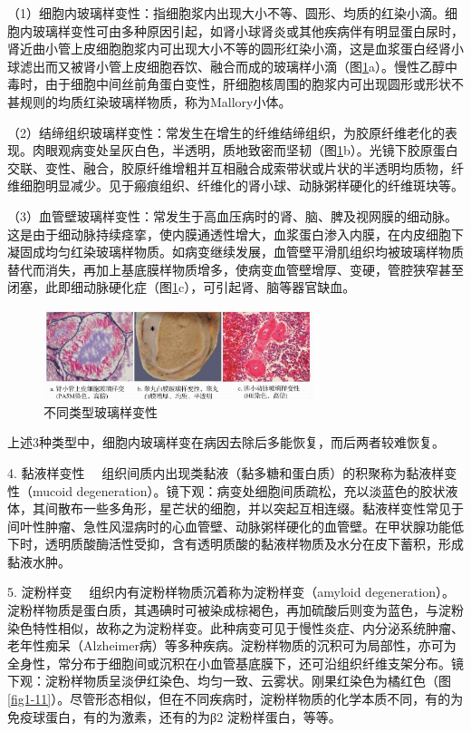 （1）细胞内玻璃样变性：指细胞浆内出现大小不等、圆形、均质的红染小滴。细胞内玻璃样变性可由多种原因引起，如肾小球肾炎或其他疾病伴有明显蛋白尿时，肾近曲小管上皮细胞胞浆内可出现大小不等的圆形红染小滴，这是血浆蛋白经肾小球滤出而又被肾小管上皮细胞吞饮、融合而成的玻璃样小滴（图\ref{fig1-10}a）。慢性乙醇中毒时，由于细胞中间丝前角蛋白变性，肝细胞核周围的胞浆内可出现圆形或形状不甚规则的均质红染玻璃样物质，称为Mallory小体。

（2）结缔组织玻璃样变性：常发生在增生的纤维结缔组织，为胶原纤维老化的表现。肉眼观病变处呈灰白色，半透明，质地致密而坚韧（图\ref{fig1-10}b）。光镜下胶原蛋白交联、变性、融合，胶原纤维增粗并互相融合成索带状或片状的半透明均质物，纤维细胞明显减少。见于瘢痕组织、纤维化的肾小球、动脉粥样硬化的纤维斑块等。

（3）血管壁玻璃样变性：常发生于高血压病时的肾、脑、脾及视网膜的细动脉。这是由于细动脉持续痉挛，使内膜通透性增大，血浆蛋白渗入内膜，在内皮细胞下凝固成均匀红染玻璃样物质。如病变继续发展，血管壁平滑肌组织均被玻璃样物质替代而消失，再加上基底膜样物质增多，使病变血管壁增厚、变硬，管腔狭窄甚至闭塞，此即细动脉硬化症（图\ref{fig1-10}c），可引起肾、脑等器官缺血。
\begin{figure}[!htbp]
	\centering
    \includegraphics[width=0.7\textwidth]{./images/Image00011.jpg}
	\caption{不同类型玻璃样变性}
	\label{fig1-10} 
	\end{figure} 
    
上述3种类型中，细胞内玻璃样变在病因去除后多能恢复，而后两者较难恢复。

{4. 黏液样变性}
　组织间质内出现类黏液（黏多糖和蛋白质）的积聚称为黏液样变性（mucoid
degeneration）。镜下观：病变处细胞间质疏松，充以淡蓝色的胶状液体，其间散布一些多角形，星芒状的细胞，并以突起互相连缀。黏液样变性常见于间叶性肿瘤、急性风湿病时的心血管壁、动脉粥样硬化的血管壁。在甲状腺功能低下时，透明质酸酶活性受抑，含有透明质酸的黏液样物质及水分在皮下蓄积，形成黏液水肿。

{5. 淀粉样变} 　组织内有淀粉样物质沉着称为淀粉样变（amyloid
degeneration）。淀粉样物质是蛋白质，其遇碘时可被染成棕褐色，再加硫酸后则变为蓝色，与淀粉染色特性相似，故称之为淀粉样变。此种病变可见于慢性炎症、内分泌系统肿瘤、老年性痴呆（Alzheimer病）等多种疾病。淀粉样物质的沉积可为局部性，亦可为全身性，常分布于细胞间或沉积在小血管基底膜下，还可沿组织纤维支架分布。镜下观：淀粉样物质呈淡伊红染色、均匀一致、云雾状。刚果红染色为橘红色（图\ref{fig1-11}）。尽管形态相似，但在不同疾病时，淀粉样物质的化学本质不同，有的为免疫球蛋白，有的为激素，还有的为β{2}
淀粉样蛋白，等等。

